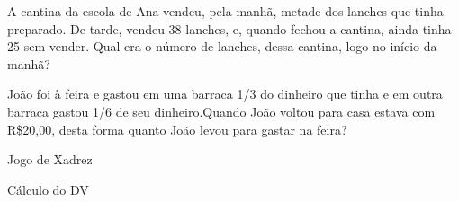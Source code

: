 

 A cantina da escola de Ana vendeu, pela manhã, metade dos lanches que tinha preparado. De tarde, vendeu 38 lanches, e, quando fechou a cantina, ainda tinha 25 sem vender. Qual era o número de lanches, dessa cantina, logo no início da manhã?


João foi à feira e gastou em uma barraca 1/3 do dinheiro que tinha e em outra barraca gastou 1/6 de seu dinheiro.Quando João voltou para casa estava com R\$20,00, desta forma quanto João levou para gastar na feira?

Jogo de Xadrez

Cálculo do DV